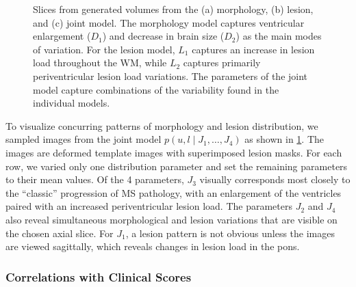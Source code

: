 \begin{figure}[tb]
{
} \caption[Slices from generated volumes from the morphology, lesion,
and joint model]{Slices from generated volumes from the (a) morphology, (b)
lesion, and (c) joint model. The morphology model captures ventricular
enlargement ($D_1$) and decrease in brain size ($D_2$) as the main modes of
variation. For the lesion model, $L_1$ captures an increase in lesion load
throughout the WM, while $L_2$ captures primarily periventricular lesion load
variations. The parameters of the joint model capture combinations
of the variability found in the individual models.}
\label{fig:samples}
\end{figure}

To visualize concurring patterns of morphology and lesion distribution, we
sampled images from the joint model $p(u, l \mid J_1, \dotsc, J_4)$ as shown in
\ref{fig:samples}. The images are deformed template images
with superimposed lesion masks. For each row, we varied only one distribution
parameter and set the remaining parameters to their mean values. Of the 4
parameters, $J_3$ visually corresponds most closely to the ``classic''
progression of MS pathology, with an enlargement of the ventricles paired with
an increased periventricular lesion load. The parameters $J_2$ and $J_4$ also
reveal simultaneous morphological and lesion variations that are visible on the
chosen axial slice. For $J_1$, a lesion pattern is not obvious unless the images
are viewed sagittally, which reveals changes in lesion load in the pons.

\subsubsection{Correlations with Clinical Scores}

